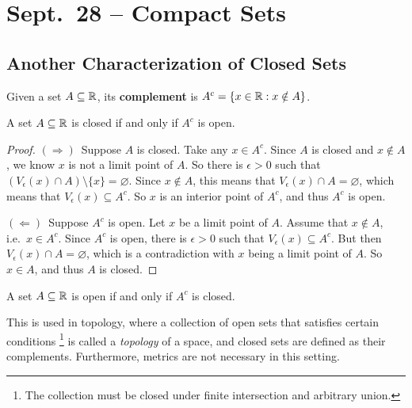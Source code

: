 \chapter{Sept.~28 -- Compact Sets}

\section{Another Characterization of Closed Sets}
\begin{definition}
  Given a set $A \subseteq \mathbb{R}$, its \textbf{complement} is
  $A^c = \{x \in \mathbb{R} : x \notin A\}$.
\end{definition}

\begin{theorem}
  A set $A \subseteq \mathbb{R}$ is closed if and only if $A^c$
  is open.
\end{theorem}

\begin{proof}
  $(\Rightarrow)$\, Suppose $A$ is closed. Take any $x \in A^c$.
  Since $A$ is closed and $x \notin A$, we know $x$ is not a
  limit point of $A$. So there is $\epsilon > 0$ such that
  $(V_\epsilon(x) \cap A) \setminus \{x\} = \varnothing$.
  Since $x \notin A$, this means that
  $V_\epsilon(x) \cap A = \varnothing$, which means that
  $V_\epsilon(x) \subseteq A^c$. So $x$ is an interior point
  of $A^c$, and thus $A^c$ is open.

  $(\Leftarrow)$\, Suppose $A^c$ is open. Let $x$ be a
  limit point of $A$. Assume that $x \notin A$, i.e.~$x \in A^c$.
  Since $A^c$ is open, there is $\epsilon > 0$ such that
  $V_\epsilon(x) \subseteq A^c$. But then
  $V_\epsilon(x) \cap A = \varnothing$, which is a contradiction
  with $x$ being a limit point of $A$. So $x \in A$, and
  thus $A$ is closed.
\end{proof}

\begin{corollary}
  A set $A \subseteq \mathbb{R}$ is open if and only if $A^c$
  is closed.
\end{corollary}

\begin{remark}
  This is used in topology, where a collection of open sets
  that satisfies certain conditions
  \footnote{The collection must be closed under finite intersection and arbitrary union.}
  is called a \textit{topology}
  of a space, and closed sets are defined as their complements.
  Furthermore, metrics are not necessary in this setting.
\end{remark}

